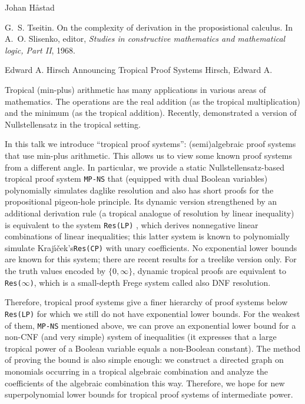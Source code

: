\documentclass[report]{owrart}
\begin{document}
\begin{report}
\begin{talk}{Johan H\aa stad}
\begin{thebibliography}{99}
G.~S. Tseitin.
\newblock On the complexity of derivation in the proposistional calculus.
\newblock In A.~O. Slisenko, editor, {\em Studies in constructive mathematics
  and mathematical logic, Part II}, 1968.
    
    \end{thebibliography}
    
    \end{talk}



 \begin{talk}{Edward A. Hirsch}
  {Announcing Tropical Proof Systems}
  {Hirsch, Edward A.}
  
  \noindent
 
  Tropical (min-plus) arithmetic has many applications in various areas of mathematics. The operations are the real addition (as the tropical multiplication) and the minimum (as the tropical addition). Recently, \cite{BE,GrPo18,JM} demonstrated a version of Nullstellensatz in the tropical setting.

In this talk we introduce ``tropical proof systems'': (semi)algebraic proof systems that use min-plus arithmetic.
This allows us to view some known proof systems from a different angle. In particular, we provide a static Nullstellensatz-based tropical proof system {\texttt{MP-NS}} that (equipped with dual Boolean variables) polynomially simulates daglike resolution and also has short proofs for the propositional pigeon-hole principle.  Its dynamic version strengthened by an additional derivation rule (a tropical analogue of resolution by linear inequality) is equivalent to the system {\texttt{Res(LP)}}  \cite{HK06}, which derives nonnegative linear combinations of linear inequalities;
this latter system is known to polynomially simulate Kraj\'{\i}\v{c}ek's\texttt{Res(CP)} \cite{Kra98} with unary coefficients.
No exponential lower bounds are known for this system; there are recent results \cite{Stabbing2,Stabbing3} for a treelike version only.
For the truth values encoded by $\{0,\infty\}$, dynamic tropical proofs are equivalent to
{\texttt{Res($\infty$)}}, which is a small-depth Frege system called also DNF resolution.

Therefore, tropical proof systems give a finer hierarchy of proof systems below {\texttt{Res(LP)}} for which we still do not have exponential lower bounds. For the weakest of them, {\texttt{MP-NS}} mentioned above, we can prove an exponential lower bound for a non-CNF (and very simple) system of inequalities (it expresses that a large tropical power of a Boolean variable equals a non-Boolean constant). The method of proving the bound is also simple enough: we construct a directed graph on monomials occurring in a tropical algebraic combination and analyze the coefficients of the algebraic combination this way. Therefore, we hope for new superpolynomial lower bounds for tropical proof systems of intermediate power. 


\end{talk}
\end{report}
\end{document}
